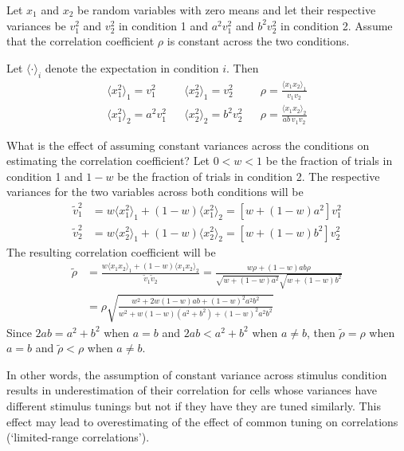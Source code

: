\documentclass[10pt]{article}
\begin{document}
Let $x_1$ and $x_2$ be random variables with zero means and let their respective variances be $v_1^2$ and $v_2^2$ in condition 1 and $a^2v_1^2$ and $b^2v_2^2$ in condition 2. Assume that the correlation coefficient $\rho$ is constant across the two conditions. 

Let $\langle \cdot \rangle_i$ denote the expectation in condition $i$. Then
\begin{align*}
\langle x_1^2 \rangle_1 = v_1^2 && \langle x_2^2 \rangle_1 = v_2^2 && \rho = \frac{\langle x_1 x_2 \rangle_1}{v_1v_2}\\ 
\langle x_1^2 \rangle_2 = a^2v_1^2 && \langle x_2^2 \rangle_2 = b^2v_2^2  && \rho = \frac{\langle x_1 x_2 \rangle_2}{ab\,v_1v_2} 
\end{align*}

What is the effect of assuming constant variances across the conditions on estimating the correlation coefficient? Let $0<w<1$ be the fraction of trials in condition 1 and $1-w$ be the fraction of trials in condition 2. The respective variances for the two variables across both conditions will be 
\begin{align*}
\tilde v_1^2 & = w\langle x_1^2 \rangle_1 + (1-w) \langle x_1^2 \rangle_2 = \left[w+(1-w)a^2\right] v_1^2
\\
\tilde v_2^2 & = w\langle x_2^2 \rangle_1 + (1-w) \langle x_2^2 \rangle_2 = \left[w+(1-w)b^2\right] v_2^2
\end{align*}
The resulting correlation coefficient will be
\begin{equation*}
\begin{split}
\tilde \rho & = \frac{w\langle x_1 x_2 \rangle_1 + (1-w)\langle x_1 x_2 \rangle_2} { \tilde v_1 \tilde v_2}
= \frac{w\rho + (1-w)ab\rho}{\sqrt{w+(1-w)a^2}\sqrt{w+(1-w)b^2}}
\\
& = \rho \sqrt{\frac{w^2+2w(1-w)ab+(1-w)^2a^2b^2}{w^2+w(1-w)(a^2+b^2)+(1-w)^2a^2b^2} }
\end{split}
\end{equation*}
Since $2ab=a^2+b^2$ when $a=b$ and $2ab < a^2 + b^2$ when $a\ne b$, then $\tilde \rho= \rho$ when $a=b$ and $\tilde \rho < \rho$ when $a\ne b$.

In other words, the assumption of constant variance across stimulus condition results in underestimation of their correlation for cells whose variances have different stimulus tunings but not if they have they are tuned similarly. This effect may lead to overestimating of the effect of common tuning on correlations (`limited-range correlations'). 
\end{document}
